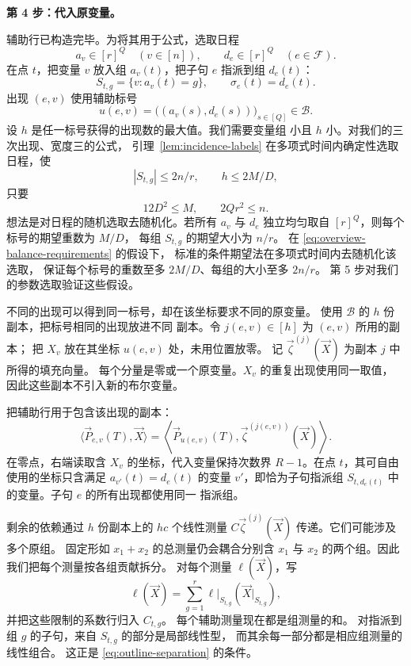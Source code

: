 \medskip\noindent
\textbf{第 4 步：代入原变量。}\par\nobreak
\smallskip\noindent
辅助行已构造完毕。为将其用于公式，选取日程
\[
 a_v\in[r]^Q\quad(v\in[n]),\qquad
 d_e\in[r]^Q\quad(e\in\mathcal F).
\]
在点 $t$，把变量 $v$ 放入组 $a_v(t)$，把子句 $e$
指派到组 $d_e(t)$：
\[
 S_{t,g}=\{v:a_v(t)=g\},\qquad \sigma_e(t)=d_e(t).
\]
出现 $(e,v)$ 使用辅助标号
\[
 u(e,v)=\bigl((a_v(s),d_e(s))\bigr)_{s\in[Q]}\in\mathcal B.
\]
设 $h$ 是任一标号获得的出现数的最大值。我们需要变量组
小且 $h$ 小。对我们的三次出现、宽度三的公式，
引理~\ref{lem:incidence-labels} 在多项式时间内确定性选取
日程，使
\[
 |S_{t,g}|\le2n/r,\qquad h\le2M/D,
\]
只要
\begin{equation}\label{eq:overview-balance-requirements}
 12D^2\le M,\qquad 2Qr^2\le n.
\end{equation}
想法是对日程的随机选取去随机化。若所有 $a_v$ 与 $d_e$
独立均匀取自 $[r]^Q$，则每个标号的期望重数为 $M/D$，
每组 $S_{t,g}$ 的期望大小为 $n/r$。
在 \eqref{eq:overview-balance-requirements} 的假设下，
标准的条件期望法在多项式时间内去随机化该选取，
保证每个标号的重数至多 $2M/D$、每组的大小至多 $2n/r$。
第 5 步对我们的参数选取验证这些假设。

不同的出现可以得到同一标号，却在该坐标要求不同的原变量。
使用 $\mathcal B$ 的 $h$ 份副本，把标号相同的出现放进不同
副本。令 $j(e,v)\in[h]$ 为 $(e,v)$ 所用的副本；
把 $X_v$ 放在其坐标 $u(e,v)$ 处，未用位置放零。
记 $\vec\zeta^{(j)}(\vec X)$ 为副本 $j$ 中所得的填充向量。
每个分量是零或一个原变量。$X_v$ 的重复出现使用同一取值，
因此这些副本不引入新的布尔变量。

把辅助行用于包含该出现的副本：
\begin{equation}\label{eq:overview-transferred-row}
 \langle\vec P_{e,v}(T),\vec X\rangle
 =\left\langle\vec P_{u(e,v)}(T),
                  \vec\zeta^{(j(e,v))}(\vec X)\right\rangle.
\end{equation}
在零点，右端读取含 $X_v$ 的坐标，代入变量保持次数界
$R-1$。在点 $t$，其可自由使用的坐标只含满足
$a_{v'}(t)=d_e(t)$ 的变量 $v'$，即恰为子句指派组
$S_{t,d_e(t)}$ 中的变量。子句 $e$ 的所有出现都使用同一
指派组。

剩余的依赖通过 $h$ 份副本上的 $hc$ 个线性测量
$C\vec\zeta^{(j)}(\vec X)$ 传递。它们可能涉及多个原组。
固定形如 $x_1+x_2$ 的总测量仍会耦合分别含 $x_1$ 与 $x_2$
的两个组。因此我们把每个测量按各组贡献拆分。
对每个测量 $\ell(\vec X)$，写
\[
 \ell(\vec X)=\sum_{g=1}^r
        \ell|_{S_{t,g}}(\vec X|_{S_{t,g}}),
\]
并把这些限制的系数行归入 $C_{t,g}$。
每个辅助测量现在都是组测量的和。
对指派到组 $g$ 的子句，来自 $S_{t,g}$ 的部分是局部线性型，
而其余每一部分都是相应组测量的线性组合。
这正是 \eqref{eq:outline-separation} 的条件。

